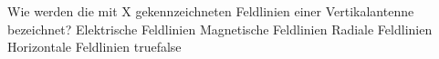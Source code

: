     {Wie werden die mit X gekennzeichneten Feldlinien einer Vertikalantenne bezeichnet?}
    {Elektrische Feldlinien}
    {Magnetische Feldlinien}
    {Radiale Feldlinien}
    {Horizontale Feldlinien}
    {true}{false}